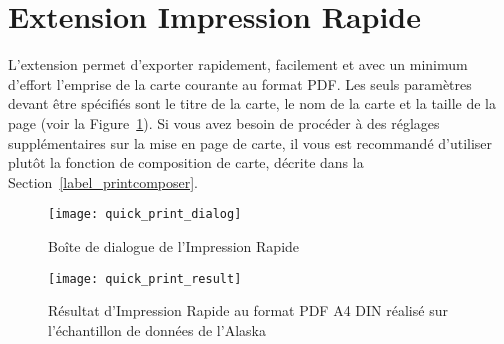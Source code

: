 
\section{Extension Impression Rapide}


L'extension  permet d'exporter rapidement, facilement et avec un minimum d'effort l'emprise de la carte courante au format PDF. Les seuls paramètres devant être spécifiés sont le titre  de la carte, le nom de la carte et la taille de la page (voir la Figure~\ref{fig:quickprint}).  Si vous avez besoin de procéder à des réglages supplémentaires sur la mise en  page de carte, il vous est recommandé d'utiliser plutôt la fonction de composition de carte, décrite dans la Section~\ref{label_printcomposer}.

\begin{figure}[htb]
\centering
   \texttt{[image: quick\_print\_dialog]}
 \caption{Boîte de dialogue de l'Impression Rapide \nixcaption}\label{fig:quickprint}
\end{figure}

\begin{figure}[htb]
\centering
   \texttt{[image: quick\_print\_result]}
   \caption{Résultat d'Impression Rapide au format PDF A4 DIN réalisé sur 
   l'échantillon de données de l'Alaska\nixcaption}\label{fig:quickprint_result}
\end{figure}

